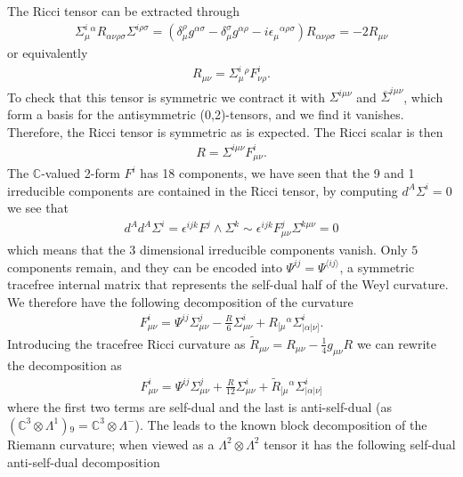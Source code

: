 \documentclass[10pt]{report}
\theoremstyle{definition}
\newcommand{\C}[0]{\mathbb{C}}
\newcommand{\E}[0]{\C^3}
\newcommand{\asd}[0]{\overline{\Sigma}}
\begin{document}
The Ricci tensor can be extracted through 
\begin{align}
    \Sigma^i_\mu{}^\alpha R_{\alpha\nu\rho\sigma} \Sigma^{i\rho\sigma} = (\delta_\mu^\rho g^{\alpha\sigma} - \delta_\mu^\sigma g^{\alpha\rho} -i \epsilon_{\mu}{}^{\alpha\rho\sigma}) R_{\alpha\nu\rho\sigma} = - 2 R_{\mu\nu}
\end{align}
or equivalently 
\begin{align}
    R_{\mu\nu} = \Sigma^i_\mu{}^\rho F^i_{\nu\rho}. \label{eq:pleb-Ricci-tensor-from-connection-curvature}
\end{align}
To check that this tensor is symmetric we contract it with $\Sigma^{i\mu\nu}$ and $\asd^{i\mu\nu}$, which form a basis for the antisymmetric (0,2)-tensors, and we find it vanishes. Therefore, the Ricci tensor is symmetric as is expected. The Ricci scalar is then 
\begin{align}
    R = \Sigma^{i\mu\nu} F^i_{\mu\nu}.
\end{align}
The $\C$-valued 2-form $F^i$ has 18 components, we have seen that the 9 and 1 irreducible components are contained in the Ricci tensor, by computing $d^A \Sigma^i = 0$ we see that 
\begin{align}
d^A d^A \Sigma^i = \epsilon^{ijk} F^j \wedge \Sigma^k \sim \epsilon^{ijk} F^j_{\mu\nu} \Sigma^{k\mu\nu} = 0
\end{align}
which means that the $3$ dimensional irreducible components vanish. Only $5$ components remain, and they can be encoded into $\Psi^{ij} = \Psi^{\langle ij\rangle }$, a symmetric tracefree internal matrix that represents the self-dual half of the Weyl curvature. We therefore have the following decomposition of the curvature 
\begin{align}
    F^i_{\mu\nu} = \Psi^{ij} \Sigma^j_{\mu\nu} - \frac{R}{6} \Sigma^i_{\mu\nu} + R_{[\mu}{}^\alpha \Sigma^i_{|\alpha|\nu]}.
\end{align}
Introducing the tracefree Ricci curvature as $\tilde{R}_{\mu\nu} = R_{\mu\nu} - \frac{1}{4} g_{\mu\nu} R$ we can rewrite the decomposition as
\begin{align}
    F^i_{\mu\nu} = \Psi^{ij} \Sigma^j_{\mu\nu} + \frac{R}{12} \Sigma^i_{\mu\nu} + \tilde{R}_{[\mu}{}^\alpha \Sigma^i_{|\alpha|\nu]}
\end{align}
where the first two terms are self-dual and the last is anti-self-dual (as $(\E \otimes \Lambda^1){}_9 = \C^3 \otimes \Lambda^-$). The leads to the known block decomposition of the Riemann curvature; when viewed as a $\Lambda^2 \otimes \Lambda^2$ tensor it has the following self-dual anti-self-dual decomposition 
\end{document}
